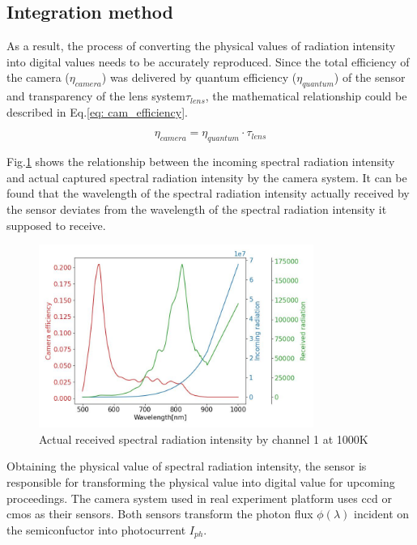\subsection{Integration method}
As a result, the process of converting the physical values of radiation intensity 
into digital values needs to be accurately reproduced. Since the total efficiency 
of the camera (${\eta}_{camera}$) was delivered by quantum efficiency (${\eta}_{quantum}$)
of the sensor and transparency of the lens system{$\tau_{lens}$}, the mathematical
relationship could be described in Eq.\ref{eq: cam_efficiency}.


\begin{equation}
    \label{eq: cam_efficiency}
    {\eta}_{camera} = {\eta}_{quantum} \cdot \tau_{lens}
\end{equation}


Fig.\ref{fig: received} shows the relationship between the incoming spectral 
radiation intensity and actual captured spectral radiation intensity 
by the camera system. It can be found that the wavelength of the spectral 
radiation intensity actually received by the sensor deviates from the wavelength of the 
spectral radiation intensity it supposed to receive.


\begin{figure}[htbp]
    \centering
    \includegraphics[width = 0.8\textwidth]{figures/received_radiation.jpg}
    \caption{Actual received spectral radiation intensity by channel 1 at 1000K}
    \label{fig: received}
\end{figure}


Obtaining the physical value of spectral radiation intensity, the sensor is responsible 
for transforming the physical value into digital value for upcoming proceedings.
The camera system used in real experiment platform uses \gls{ccd} or \gls{cmos}
as their sensors. Both sensors transform the photon flux $\phi (\lambda)$ 
incident on the semiconfuctor into photocurrent $I_{ph}$\cite{Fossum.2014}. 

